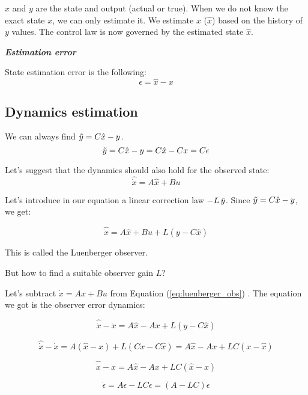 \(x\) and \(y\) are the state and output (actual or true). When we do not know the exact state \(x\), we can only estimate it. We estimate \(x\) (\(\hat x\)) based on the history of \(y\) values. The control law is now governed by the estimated state \(\hat x\).

\begin{center}
    \textit{\textbf{Estimation error}}
\end{center}

State estimation error is the following:
\[
\epsilon = \hat x - x
\]

\subsection{Dynamics estimation}

We can always find \(\Tilde y = C \hat x - y\).
\[ \Tilde y = C \hat x - y = C \hat x - Cx = C \epsilon\]

Let's suggest that the dynamics should also hold for the observed state:
\[
    \hat{\dot {x}} = A \hat x + Bu
\]

Let's introduce in our equation a linear correction law \( -L \, \Tilde y\). Since \(\Tilde y = C \hat x - y\), we get:

\begin{equation}\label{eq:luenberger_obs}
    \hat{\dot {x}} = A \hat x + Bu + L(y - C \hat x) 
\end{equation}


This is called the Luenberger observer.  

But how to find a suitable observer gain \(L\)?

Let's subtract \(\dot x = Ax + Bu\) from Equation  (\ref{eq:luenberger_obs}) . The equation we got is the observer error dynamics:

\begin{equation}
    \hat{\dot {x}} - \dot x = A \hat x - Ax + L(y - C \hat x)
\end{equation}

\begin{equation}
    \hat{\dot {x}} - \dot x = A (\hat x - x) + L(Cx - C \hat x) = A \hat x - Ax + LC(x - \hat x)
\end{equation}


\begin{equation}
    \hat{\dot {x}} - \dot x = A \hat x - Ax + LC(\hat x - x)
\end{equation}

\begin{equation}
    \dot \epsilon = A \epsilon - LC \epsilon = (A-LC) \epsilon
\end{equation}


